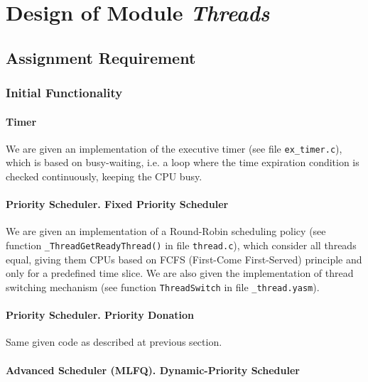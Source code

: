 
\chapter{Design of Module \textit{Threads}}


\section{Assignment Requirement}


\subsection{Initial Functionality}

\subsubsection{Timer}

We are given an implementation of the executive timer (see file \lstinline|ex_timer.c|), which is based on busy-waiting, i.e. a loop where the time expiration condition is checked continuously, keeping the CPU busy.

\subsubsection{Priority Scheduler. Fixed Priority Scheduler}

We are given an implementation of a Round-Robin scheduling policy (see function \lstinline|_ThreadGetReadyThread()| in file \lstinline|thread.c|), which consider all threads equal, giving them CPUs based on FCFS (First-Come First-Served) principle and only for a predefined time slice. We are also given the implementation of thread switching mechanism (see function \lstinline|ThreadSwitch| in file \lstinline|_thread.yasm|). 

\subsubsection{Priority Scheduler. Priority Donation}

Same given code as described at previous section. 

\subsubsection{Advanced Scheduler (MLFQ). Dynamic-Priority Scheduler}


